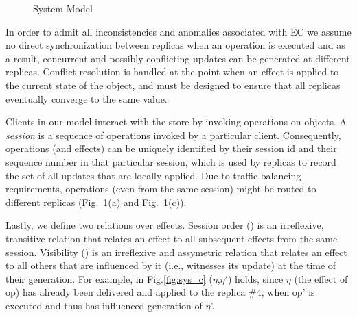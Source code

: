 \documentclass[authorversion]{sig-alternate-05-2015}
\begin{document}
\begin{figure}[h]
\label{fig:sys}
\caption{System Model}
\end{figure}
%
In order to admit all inconsistencies and anomalies associated with EC we assume no direct synchronization between replicas when an operation is 
executed and as a result, concurrent and possibly conflicting updates can be generated
at different replicas.
Conflict resolution is handled at the point when an effect is applied to the 
current state of the object, and must be designed to ensure that all replicas 
eventually converge to the same value. 

Clients in our model interact with the store by invoking operations on objects. 
A \emph{session} is a sequence of operations invoked by a particular client. 
Consequently, operations (and effects) can be uniquely identified by their session id and 
their sequence number in that particular session, which is used by
replicas to record the set of all updates that are locally applied. 
Due to traffic balancing requirements, 
operations (even from the same session) might be routed to different replicas (Fig.~1(a) and Fig.~1(c)).

Lastly, we define two relations over effects. 
Session order (\sor) is an irreflexive, transitive relation that relates an effect
 to all subsequent effects from the same session. Visibility (\visib) is an 
irreflexive and assymetric relation that relates an effect to all others that are influenced 
by it (i.e., witnesses its update) at the time of their generation. 
For example, in Fig.\ref{fig:sys_c} \visib($\eta$,$\eta'$) holds, since $\eta$ (the effect of op) 
has already been delivered and applied to the replica \#4, when op' is 
executed and thus has influenced generation of $\eta$'.


















\end{document}
